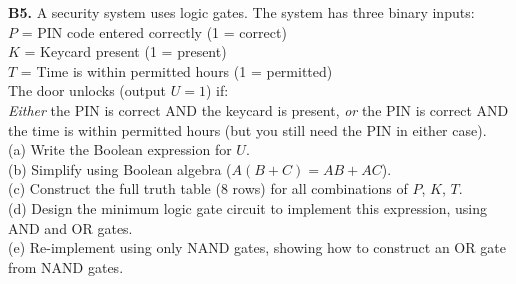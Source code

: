 \begin{exercisebox}[29]
\textbf{B5.} A security system uses logic gates.
The system has three binary inputs:\\
$P$ = PIN code entered correctly (1 = correct)\\
$K$ = Keycard present (1 = present)\\
$T$ = Time is within permitted hours (1 = permitted)\\
The door unlocks (output $U = 1$) if:\\
\textit{Either} the PIN is correct AND the keycard
is present, \textit{or} the PIN is correct AND the
time is within permitted hours (but you still need
the PIN in either case).\\[4pt]
(a) Write the Boolean expression for $U$.\\
(b) Simplify using Boolean algebra
($A(B+C) = AB + AC$).\\
(c) Construct the full truth table (8 rows) for
all combinations of $P$, $K$, $T$.\\
(d) Design the minimum logic gate circuit to
implement this expression, using AND and OR gates.\\
(e) Re-implement using only NAND gates, showing
how to construct an OR gate from NAND gates.
\hfill{}

\end{exercisebox}
